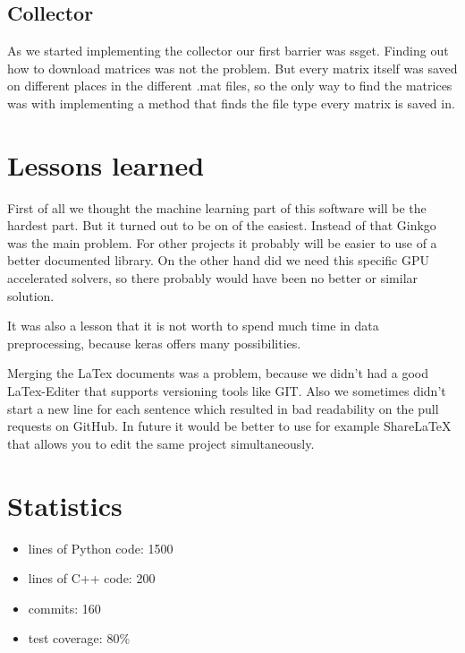 \documentclass[parskip=full]{scrartcl}
\begin{document}
\subsection{Collector}
As we started implementing the collector our first barrier was \gls{ssget}. 
Finding out how to download matrices was not the problem.
But every matrix itself was saved on different places in the different .mat files, so the only way to find the matrices was with implementing a method that finds the file type every matrix is saved in.

\section{Lessons learned}
First of all we thought the machine learning part of this software will be the hardest part.
But it turned out to be on of the easiest.
Instead of that \gls{Ginkgo} was the main problem.
For other projects it probably will be easier to use of a better documented library.
On the other hand did we need this specific GPU accelerated solvers, so there probably would have been no better or similar solution.


It was also a lesson that it is not worth to spend much time in data
preprocessing, because keras offers many possibilities.

Merging the LaTex documents was a problem, because we didn't had a good LaTex-Editer that supports versioning tools like GIT.
Also we sometimes didn't start a new line for each sentence which resulted in bad readability on the pull requests on GitHub.
In future it would be better to use for example ShareLaTeX that allows you to edit the same project simultaneously.

\section{Statistics}
 
\begin{itemize}

\item lines of Python code: 1500

\item lines of C++ code: 200

\item commits: 160

\item test coverage: 80\%

\end{itemize}
\end{document}
